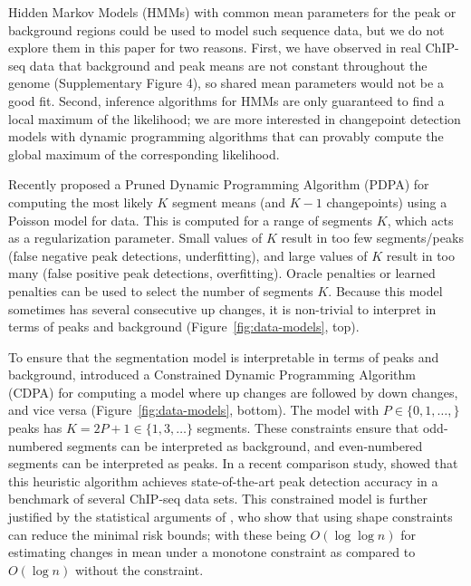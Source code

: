 \documentclass[aoas]{imsart}
\begin{document}
Hidden Markov Models (HMMs) with common mean parameters for the peak
or background regions could be used to model such sequence data, but
we do not explore them in this paper for two reasons. First, we have
observed in real ChIP-seq data that background and peak means are not
constant throughout the genome (Supplementary Figure 4), so shared
mean parameters would not be a good fit. Second, inference algorithms
for HMMs are only guaranteed to find a local maximum of the
likelihood; we are more interested in changepoint detection models
with dynamic programming algorithms that can provably compute the
global maximum of the corresponding likelihood.

Recently \citet{cleynen2013segmentation} proposed a Pruned Dynamic
Programming Algorithm (PDPA) for computing the most likely $K$ segment
means (and $K-1$ changepoints) using a Poisson model for 
data. This is computed for a range
of segments $K$, which acts as a regularization parameter. Small
values of $K$ result in too few segments/peaks (false negative peak detections, underfitting), and
large values of $K$ result in too many (false positive peak detections, overfitting). Oracle penalties
\citep{cleynen2013segmentation} or learned penalties
\citep{HOCKING-penalties} can be used to select the number of segments
$K$.
Because this model sometimes has several consecutive up
changes, it is non-trivial to interpret in terms of peaks and
background (Figure~\ref{fig:data-models}, top).

To ensure that the segmentation model is interpretable in terms of
peaks and background, \citet{HOCKING-PeakSeg} introduced a Constrained
Dynamic Programming Algorithm (CDPA) for computing a model where up changes are followed by down changes, and vice
versa (Figure~\ref{fig:data-models}, bottom). The model with
$P\in\{0,1,\dots, \}$ peaks has $K=2P+1\in\{1, 3, \dots\}$
segments. These constraints ensure that odd-numbered segments can be
interpreted as background, and even-numbered segments can be
interpreted as peaks.
In a recent comparison study, \citet{HOCKING2016-chipseq} showed that
this heuristic algorithm achieves state-of-the-art peak detection
accuracy in a benchmark of several ChIP-seq data sets. This
constrained model is further justified by the statistical arguments of
\citet{minimax-changepoint}, who show that using shape constraints can
reduce the minimal risk bounds; with these being $O(\log \log n)$ for
estimating changes in mean under a monotone constraint as compared to
$O(\log n)$ without the constraint.
\end{document}

